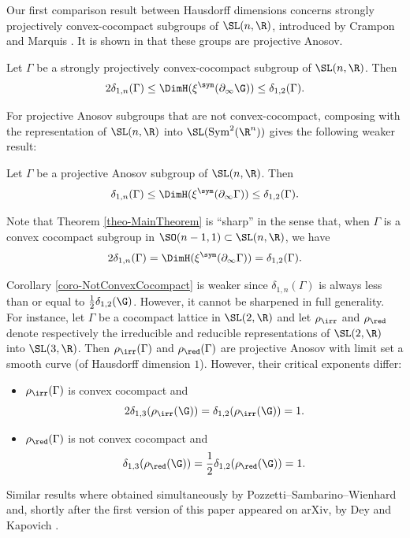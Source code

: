 Our first comparison result between Hausdorff dimensions concerns strongly projectively convex-cocompact subgroups of $\SL(n,\R)$, introduced by Crampon and Marquis \cite{crampon2014finitude}. It is shown in \cite{DGK} that these groups are projective Anosov.

\begin{theo} \label{theo-MainTheorem}
Let $\Gamma$ be a strongly projectively convex-cocompact subgroup of $\SL(n,\R)$. Then
\[2 \delta_{1,n}(\Gamma) \leq \DimH(\xi^{\sym}(\partial_\infty \G)) \leq \delta_{1,2}(\Gamma).\]
\end{theo}

For projective Anosov subgroups that are not convex-cocompact, composing with the representation of $\SL(n,\R)$ into $\SL(\mathrm{Sym}^2(\R^n))$ gives the following weaker result:
\begin{coro} \label{coro-NotConvexCocompact}
Let $\Gamma$ be a projective Anosov subgroup of $\SL(n,\R)$. Then
\[\delta_{1,n}(\Gamma) \leq \DimH(\xi^{\sym}(\partial_\infty \Gamma)) \leq \delta_{1,2}(\Gamma).\]
\end{coro}

Note that Theorem \ref{theo-MainTheorem} is ``sharp'' in the sense that, when $\Gamma$ is a convex cocompact subgroup in $\SO(n-1,1)\subset \SL(n,\R)$, we have
\[2\delta_{1,n}(\Gamma) = \DimH(\xi^{\sym}(\partial_\infty\Gamma)) = \delta_{1,2}(\Gamma).\]

Corollary \ref{coro-NotConvexCocompact} is weaker since $\delta_{1,n}(\Gamma)$ is always less than or equal to $\frac{1}{2} \delta_{1,2}(\G)$. However, it cannot be sharpened in full generality. For instance, let $\Gamma$ be a cocompact lattice in $\SL(2,\R)$ and let $\rho_{\irr}$ and $\rho_{\red}$ denote respectively the irreducible and redu\-cible representations of $\SL(2,\R)$ into $\SL(3,\R)$. Then $\rho_{\irr}(\Gamma)$ and $\rho_{\red}(\Gamma)$ are projective Anosov with limit set a smooth curve (of Hausdorff dimension $1$). However, their critical exponents differ:
\begin{itemize}
\item $\rho_{\irr}(\Gamma)$ is convex cocompact and
\[2\delta_{1,3}(\rho_{\irr}(\G)) = \delta_{1,2}(\rho_{\irr}(\G)) = 1.\]
\item $\rho_{\red}(\Gamma)$ is not convex cocompact and
\[\delta_{1,3}(\rho_{\red}(\G)) = \frac{1}{2} \delta_{1,2}(\rho_{\red}(\G)) = 1.\]
\end{itemize}

Similar results where obtained simultaneously by Pozzetti--Sambarino--Wienhard \cite{PSW19} and, shortly after the first version of this paper appeared on arXiv, by Dey and Kapovich \cite{DeyKapovich}.

